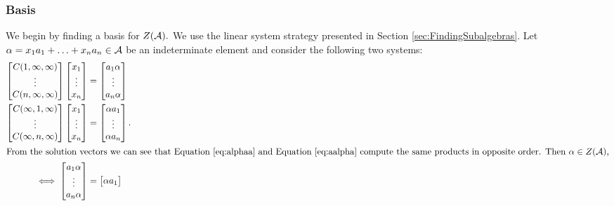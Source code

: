 \documentclass[../thesis.tex]{subfiles}
\begin{document}
\subsubsection{Basis}\label{sec:CenterBasis}
We begin by finding a basis for $Z(\mathcal{A}).$ We use the linear system strategy presented in Section \ref{sec:FindingSubalgebras}. Let $\alpha = x_1a_1+\hdots+x_na_n\in \mathcal{A}$ be an indeterminate element and consider the following two systems:
\begin{align}
 \begin{bmatrix} 
    C(1,\infty,\infty)\\
    \vdots\\
    C(n,\infty,\infty)\\
    \end{bmatrix}
\begin{bmatrix}
    x_1\\ \vdots\\ x_n
\end{bmatrix}
&=
\begin{bmatrix}
    a_1\alpha \\ \vdots\\ a_n\alpha
\end{bmatrix} \label{eq:alphaa}\\
\begin{bmatrix} 
    C(\infty,1,\infty)\\
    \vdots\\
    C(\infty,n,\infty)\\
    \end{bmatrix}
\begin{bmatrix}
    x_1\\ \vdots\\ x_n
\end{bmatrix}
&= 
\begin{bmatrix}
    \alpha a_1\\ \vdots\\ \alpha a_n
\end{bmatrix}. \label{eq:aalpha}\\
\intertext{From the solution vectors we can see that Equation \ref{eq:alphaa} and Equation \ref{eq:aalpha} compute the same products in opposite order. Then $\alpha\in Z(\mathcal{A})$,}
\iff\begin{bmatrix}
    a_1\alpha\\
    \vdots\\
    a_n\alpha
\end{bmatrix}
&= 
\begin{bmatrix}
    \alpha a_1\\

\end{bmatrix}
\end{align}
\end{document}
